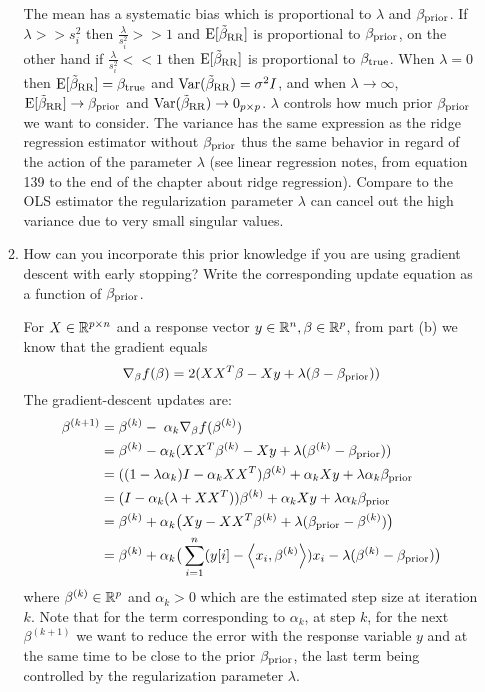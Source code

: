\documentclass[12pt,twoside]{article}
\begin{document}
\begin{enumerate}
\begin{enumerate}
   The mean has a systematic bias which is proportional to $\lambda$ and  $\beta_{\operatorname{prior}}$. 
   If $\lambda >> s_i^2$ then $\frac{\lambda}{s_i^2} >> 1$ and $\mathrm{E}[\tilde{\beta}_{\operatorname{RR}} ]	$ is proportional to $\beta_{\operatorname{prior}} $, 
   on the other hand if $\frac{\lambda}{s_i^2} << 1$ then $\mathrm{E}[\tilde{\beta}_{\operatorname{RR}} ]	$ is proportional to $\beta_{\operatorname{true}}$.
   When $\lambda = 0$ then $\mathrm{E}[\tilde{\beta}_{\operatorname{RR}} ] = \beta_{\operatorname{true}}$ and $\mathrm{Var}(\tilde{\beta}_{\operatorname{RR}}) = \sigma^2 I$,
   and when $\lambda \rightarrow \infty$, $\mathrm{E}[\tilde{\beta}_{\operatorname{RR}} ] \rightarrow  \beta_{\operatorname{prior}}$ and $\mathrm{Var}(\tilde{\beta}_{\operatorname{RR}}) \rightarrow 0_{p \times p}$.
   $\lambda$ controls how much prior $\beta_{\operatorname{prior}}$ we want to consider.
   The variance has the same expression as the ridge regression estimator without $\beta_{\operatorname{prior}}$ thus the same behavior in regard of the action of the parameter $\lambda$ 
   (see linear regression notes, from equation 139 to the end of the chapter about ridge regression).
   Compare to the OLS estimator the regularization parameter $\lambda$ can cancel out the high variance due to very small singular values.
   
    \item How can you incorporate this prior knowledge if you are using gradient descent with early stopping? Write the corresponding update equation as a function of $\beta_{\operatorname{prior}}$.\\

\medskip				

For $X  \in \mathbb{R}^{p \times n}$ and a response vector $y \in \mathbb{R}^n, \beta \in \mathbb{R}^p$, from part (b) we know that the gradient equals $$\nabla_{\beta} f(\beta) =	2 (X X^T \beta - X y +  \lambda (\beta - \beta_{\operatorname{prior}}))$$
The gradient-descent updates are:
\begin{align*}
		\beta^{(k+1)}	&=	\beta^{(k)} - \; \alpha_k \nabla_{\beta} f(\beta^{(k)})	\\
					&=	\beta^{(k)}  - \alpha_k (X X^T \beta^{(k)} - X y +  \lambda (\beta^{(k)} - \beta_{\operatorname{prior}})) \\
					&=    ((1- \lambda \alpha_k) I  - \alpha_k X X^T) \beta^{(k)}  +  \alpha_k  X y  + \lambda  \alpha_k  \beta_{\operatorname{prior}} \\
					&=	(I -  \alpha_k (\lambda +  X X^T)) \beta^{(k)}  +  \alpha_k  X y  + \lambda  \alpha_k  \beta_{\operatorname{prior}} \\
					&=	\beta^{(k)}  + \alpha_k  \big( X y  - X X^T \beta^{(k)}   + \lambda (\beta_{\operatorname{prior}} - \beta^{(k)}) \big) \\
					&=	 \beta^{(k)}  +  \alpha_k  \big( \sum_{i=1}^n (y[i] - \left \langle x_i, \beta^{(k)}\right \rangle) x_i - \lambda ( \beta^{(k)}  -   \beta_{\operatorname{prior}}) \big)
\end{align*}
   where $\beta^{(k)} \in \mathbb{R}^p$ and $ \alpha_k > 0$ which are the estimated step size at iteration $k$. Note that for the term corresponding to $\alpha_k$, at  step $k$, for the next $\beta^{(k+1)}$ 
   we want to reduce the error with the response variable $y$  and at the same time to be close to the prior $\beta_{\operatorname{prior}}$, the last term being controlled by the regularization parameter $\lambda$.
   

\end{enumerate}
\end{enumerate}
\end{document}
